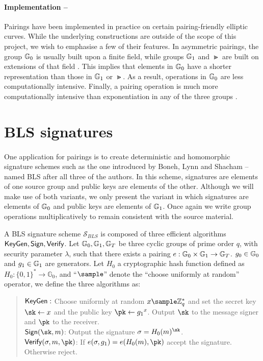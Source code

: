 \paragraph{Implementation --} Pairings have been implemented in practice on certain pairing-friendly elliptic curves. While the underlying constructions are outside of the scope of this project, we wish to emphasise a few of their features. In asymmetric pairings, the group $\mathbb{G}_0$ is usually built upon a finite field, while groups $\mathbb{G}_1$ and $\Gt$ are built on extensions of that field \cite{BonehShoup}. This implies that elements in $\mathbb{G}_0$ have a shorter representation than those in $\mathbb{G}_1$ or $\Gt$. As a result, operations in $\mathbb{G}_0$ are less computationally intensive. Finally, a pairing operation is much more computationally intensive than exponentiation in any of the three groups \cite{BonehShoup}.

\section{BLS signatures}

\paragraph{} One application for pairings is to create deterministic and homomorphic signature schemes such as the one introduced by Boneh, Lynn and Shacham \cite{BLS} -- named BLS after all three of the authors. In this scheme, signatures are elements of one source group and public keys are elements of the other. Although we will make use of both variants, we only present the variant in which signatures are elements of $\mathbb{G}_0$ and public keys are elements of $\mathbb{G}_1$. Once again we write group operations multiplicatively to remain consistent with the source material.


\begin{definition}
	A BLS signature scheme $\mathcal{S}_{BLS}$ is composed of three efficient algorithms $\mathsf{KeyGen}, \mathsf{Sign}, \mathsf{Verify}$. Let $\mathbb{G}_0, \mathbb{G}_1, \mathbb{G}_T$ be three cyclic groups of prime order $q$, with security parameter $\lambda$, such that there exists a pairing $e : \mathbb{G}_0 \times \mathbb{G}_1 \rightarrow \mathbb{G}_T$. $g_0 \in \mathbb{G}_0$ and $g_1 \in \mathbb{G}_1$ are generators. Let $H_0$ a cryptographic hash function defined as $H_0: \{0,1\}^* \rightarrow \mathbb{G}_0$, and ``$\sample$'' denote the ``choose uniformly at random'' operator, we define the three algorithms as:
	\begin{quote}
		$\mathsf{KeyGen}:$ Choose uniformly at random $x \sample \mathbb{Z}_q^* $ and set the secret key $\sk \leftarrow x$ and the public key $\pk \leftarrow {g_1}^x$. Output $\sk$ to the message signer and $\pk$ to the receiver. \\
		$\Sign(\sk, m)$: Output the signature $\sigma = H_0(m)^\sk$. \\
		$\Verif(\sigma, m, \pk)$: If $e(\sigma, g_1) = e(H_0(m), \pk)$ accept the signature. Otherwise reject.
	\end{quote}

\end{definition} 

